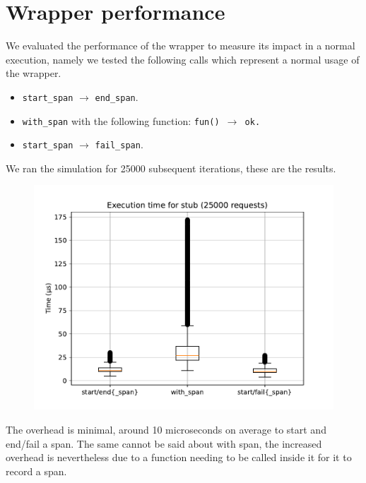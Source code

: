 \section{Wrapper performance}
    We evaluated the performance of the wrapper to measure its impact in a normal execution, namely we tested the following calls which represent a normal usage of the wrapper.
    \begin{itemize}
        \item \texttt{start\_span} $\rightarrow$ \texttt{end\_span}.
        \item \texttt{with\_span} with the following function: \texttt{fun() $\rightarrow$ ok.}
        \item \texttt{start\_span} $\rightarrow$ \texttt{fail\_span}.
    \end{itemize}

    We ran the simulation for 25000 subsequent iterations, these are the results.
    \begin{figure}[H]
        \begin{center}
            \includegraphics[width=0.8\linewidth]{img/stub.pdf}
        \end{center}
    \end{figure}

    The overhead is minimal, around 10 microseconds on average to start and end/fail a span. The same cannot be said about with span, the increased overhead is nevertheless due to a function needing to be called inside it for it to record a span. 

